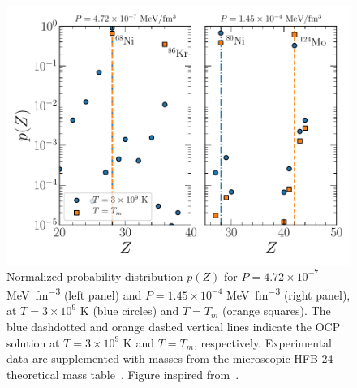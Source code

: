 \begin{figure}[!t]
  \begin{center}
    \includegraphics[width=0.9\linewidth]{figures/pj_ocrust.pdf}
  \end{center}
  \caption[Normalized probability distribution of the atomic number $Z$ in the 
  outer-crust regime]{Normalized 
    probability distribution 
    $p(Z)$ for $P=4.72\times 10^{-7}$ \si{\MeV \per \cubic\femto\meter} (left 
    panel) and $P=1.45\times 
    10^{-4}$ \si{\MeV \per \cubic\femto\meter} (right panel), at 
    $T=3\times 10^9$ \si{\kelvin} (blue circles) and 
    $T=T_m$ (orange squares). The blue dashdotted and orange dashed vertical 
    lines indicate the OCP solution at $T=3\times 10^9$ \si{\kelvin} and 
    $T=T_m$, respectively.
    Experimental data are supplemented with masses from the microscopic 
    HFB-24 theoretical mass table~\cite{Goriely2013}. 
    Figure inspired from~\cite{Fantina2020}.}\label{fig:pj_ocrust}
\end{figure}

